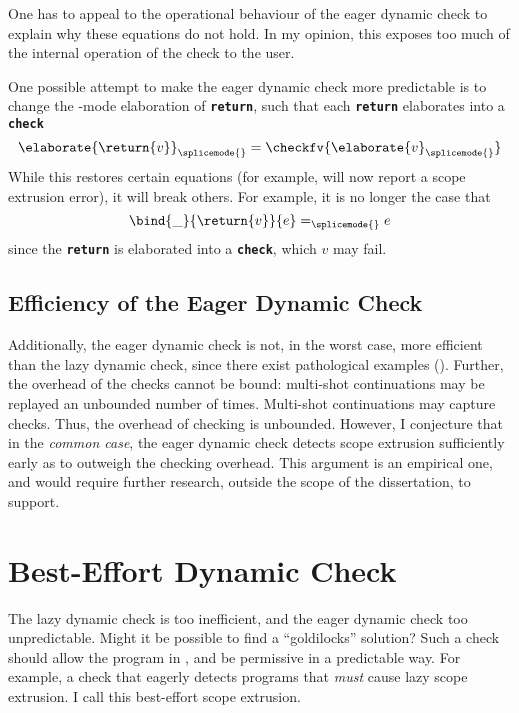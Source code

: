 One has to appeal to the operational behaviour of the eager dynamic check to explain why these equations do not hold. In my opinion, this exposes too much of the internal operation of the check to the user. 

One possible attempt to make the eager dynamic check more predictable is to change the \splicemode{}-mode elaboration of \textbf{\texttt{return}}, such that each \textbf{\texttt{return}} elaborates into a \textbf{\texttt{check}}
\[\elaborate{\return{v}}_{\splicemode{}} = \checkfv{\elaborate{v}_{\splicemode{}}}\]
While this restores certain equations (for example,  will now report a scope extrusion error), it will break others. For example, it is no longer the case that
\[\bind{\_}{\return{v}}{e} =_{\splicemode{}} e\]
since the \textbf{\texttt{return}} is elaborated into a \textbf{\texttt{check}}, which $v$ may fail.

\subsection{Efficiency of the Eager Dynamic Check}\label{subsection:eager-dynamic-efficiency}
Additionally, the eager dynamic check is not, in the worst case, more efficient than the lazy dynamic check, since there exist pathological examples (). Further, the overhead of the checks cannot be bound: multi-shot continuations may be replayed an unbounded number of times. Multi-shot continuations may capture checks. Thus, the overhead of checking is unbounded. However, I conjecture that in the \textit{common case}, the eager dynamic check detects scope extrusion sufficiently early as to outweigh the checking overhead. This argument is an empirical one, and would require further research, outside the scope of the dissertation, to support. 

\section{Best-Effort Dynamic Check}\label{section:best-effort-check}
The lazy dynamic check is too inefficient, and the eager dynamic check too unpredictable. Might it be possible to find a ``goldilocks'' solution? Such a check should allow the program in , and be permissive in a predictable way. For example, a check that eagerly detects programs that \textit{must} cause lazy scope extrusion. I call this best-effort scope extrusion.

